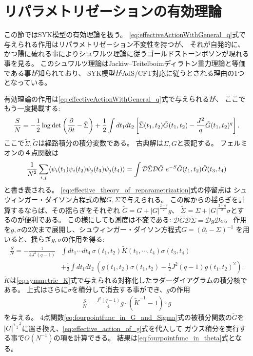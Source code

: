 \section{リパラメトリゼーションの有効理論 \label{sec:effective_theory}}
この節ではSYK模型の有効理論を扱う。
\eqref{eq:effectiveActionWithGeneral_q}式で与えられる作用はリパラメトリゼーション不変性を持つが、
それが自発的に、かつ陽に破れる事によりシュワルツ理論に従うゴールドストーンボソンが現れる事を見る。
このシュワルツ理論はJackiw--Teitelboimディラトン重力理論と等価である事が知られており、
SYK模型がAdS/CFT対応に従うとされる理由の1つとなっている。

有効理論の作用は\eqref{eq:effectiveActionWithGeneral_q}式で与えられるが、
ここでもう一度掲載する:
\begin{align}
	\frac{S}{N}
	= -\frac{1}{2}\log\det\left(\frac{\partial}{\partial t} - \tilde{\Sigma}\right)
		+ \frac{1}{2}\int dt_1dt_2
		\left[
			\tilde{\Sigma}(t_1, t_2)\tilde{G}(t_1, t_2)
			- \frac{J^2}{q}\tilde{G}(t_1, t_2)^q
		\right].
	\label{eq:effective_theory_of_reparametrization}
\end{align}
ここで$\tilde{\Sigma},\tilde{G}$は経路積分の積分変数である。
古典解は$\Sigma, G$と表記する。
フェルミオンの４点関数は
\begin{align}
	\frac{1}{N^2}\sum_{i,j}\average{\psi_i(t_1)\psi_i(t_2)\psi_j(t_3)\psi_j(t_4)}
	= \int \mathcal{D}\tilde{\Sigma}\mathcal{D}\tilde{G}\ 
		e^{-S}\tilde{G}(t_1, t_2)\tilde{G}(t_3, t_4)
	\label{eq:fourpointfunc_in_G_and_Sigma}
\end{align}
と書き表される。
\eqref{eq:effective_theory_of_reparametrization}式の停留点は
シュウィンガー・ダイソン方程式の解$G,\Sigma$で与えられる。
この解からの揺らぎを計算するならば、その揺らぎをそれぞれ
$\tilde{G} = G + |G|^{\frac{2-q}{2}}g$、
$\tilde{\Sigma} = \Sigma + |G|^{\frac{2-q}{2}}\sigma$とするのが便利である。
この様にしても測度は不変である: 
$\mathcal{D}\tilde{G}\mathcal{D}\tilde{\Sigma} = \mathcal{D}g\mathcal{D}\sigma$。
作用を$g,\sigma$の2次まで展開し、シュウィンガー・ダイソン方程式$G = (\partial_t - \Sigma)^{-1}$
を用いると、揺らぎ$g,\sigma$の作用を得る:
\begin{align}
	\frac{S}{N}
		= -\frac{1}{4J^2(q-1)}&\int dt_1\cdots dt_4\ 
			\sigma(t_1, t_2)\tilde{K}(t_1, \cdots, t_4)\sigma(t_3, t_4)\nonumber\\
		&+ \frac{1}{2}\int dt_1dt_2\ 
		\left(
			g(t_1, t_2)\sigma(t_1, t_2) - \frac{1}{2}J^2(q-1)g(t_1, t_2)^2
		\right).
\end{align}
$\tilde{K}$は\eqref{eq:symmetric_K}式で与えられる対称化したラダーダイアグラムの積分核である。
上式はさらに$\sigma$を積分して消去する事ができ、$g$の作用
\begin{align}
	\frac{S}{N} = \frac{J^2(q-1)}{4}g\cdot(\tilde{K}^{-1} - 1)\cdot g
	\label{eq:effective_action_of_g}
\end{align}
を与える。
4点関数\eqref{eq:fourpointfunc_in_G_and_Sigma}式の被積分関数の$\tilde{G}$を
$|G|^{\frac{q-2}{2}}$に置き換え、\eqref{eq:effective_action_of_g}式を代入して
ガウス積分を実行する事で$O(N^{-1})$の項を計算できる。
結果は\eqref{eq:fourpointfunc_in_theta}式となる。

